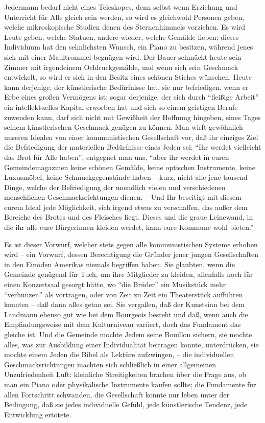 \documentclass{scrbook}
\begin{document}
Jedermann bedarf nicht eines Teleskopes, denn selbst wenn Erziehung und Unterricht für Alle gleich sein werden, so wird es gleichwohl Personen geben, welche mikroskopische Studien denen des Sternenhimmels vorziehen. Es wird Leute geben, welche Statuen, andere wieder, welche Gemälde lieben; dieses Individuum hat den sehnlichsten Wunsch, ein Piano zu besitzen, während jenes sich mit einer Maultrommel begnügen wird. Der Bauer schmückt heute sein Zimmer mit irgendeinem Oeldruckgemälde, und wenn sich sein Geschmack entwickelt, so wird er sich in den Besitz eines schönen Stiches wünschen. Heute kann derjenige, der künstlerische Bedürfnisse hat, sie nur befriedigen‚ wenn er Erbe eines großen Vermögens ist; sogar derjenige, der sich durch ``fleißige Arbeit'' ein intellektuelles Kapital erworben hat und sich so einem geistigen Berufe zuwenden kann, darf sich nicht mit Gewißheit der Hoffnung hingeben, eines Tages seinem künstlerischen Geschmack genügen zu können. Man wirft gewöhnlich unseren Idealen von einer kommunistischen Gesellschaft vor, daß ihr einziges Ziel die Befriedigung der materiellen Bedürfnisse eines Jeden sei: ``Ihr werdet vielleicht das Brot für Alle haben'', entgegnet man uns, ``aber ihr werdet in euren Gemeindemagazinen keine schönen Gemälde, keine optischen Instrumente, keine Luxusmöbel, keine Schmuckgegenstände haben – kurz, nicht alle jene tausend Dinge, welche der Befriedigung der unendlich vielen und verschiedenen menschlichen Geschmacksrichtungen dienen. – Und Ihr beseitigt mit diesem eurem Ideal jede Möglichkeit, sich irgend etwas zu verschaffen, das außer dem Bereiche des Brotes und des Fleisches liegt. Dieses und die graue Leinewand, in die ihr alle eure Bürgerinnen kleiden werdet, kann eure Kommune wohl bieten.''

Es ist dieser Vorwurf, welcher stets gegen alle kommunistischen Systeme erhoben wird – ein Vorwurf, dessen Berechtigung die Gründer jener jungen Gesellschaften in den Einöden Amerikas niemals begriffen haben. Sie glaubten, wenn die Gemeinde genügend für Tuch, um ihre Mitglieder zu kleiden, allenfalls noch für einen Konzertsaal gesorgt hätte, wo ``die Brüder'' ein Musikstück mehr ``verhunzen'' als vortragen, oder von Zeit zu Zeit ein Theaterstück aufführen konnten – daß dann alles getan sei. Sie vergaßen, daß der Kunstsinn bei dem Landmann ebenso gut wie bei dem Bourgeois besteht und daß, wenn auch die Empfindungsweise mit dem Kulturniveau variiert, doch das Fundament das gleiche ist. Und die Gemeinde mochte Jedem seine Bouillon sichern, sie mochte alles, was zur Ausbildung einer Individualität beitragen konnte, unterdrücken, sie mochte einem Jeden die Bibel als Lektüre aufzwingen, – die individuellen Geschmacksrichtungen machten sich schließlich in einer allgemeinen Unzufriedenheit Luft: kleinliche Streitigkeiten brachen über die Frage aus, ob man ein Piano oder physikalische Instrumente kaufen sollte; die Fundamente für allen Fortschritt schwanden, die Gesellschaft konnte nur leben unter der Bedingung, daß sie jedes individuelle Gefühl, jede künstlerische Tendenz, jede Entwicklung ertötete.
\end{document}
